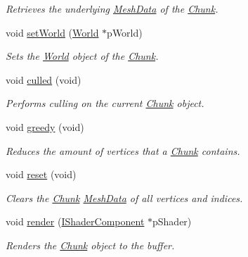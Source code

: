 \begin{DoxyCompactItemize}
\begin{DoxyCompactList}\small\item\em Retrieves the underlying \hyperlink{classsparky_1_1_mesh_data}{Mesh\+Data} of the \hyperlink{classsparky_1_1_chunk}{Chunk}. \end{DoxyCompactList}\item 
void \hyperlink{classsparky_1_1_chunk_a998e3e80913675edf552c927487a7df1}{set\+World} (\hyperlink{classsparky_1_1_world}{World} $\ast$p\+World)
\begin{DoxyCompactList}\small\item\em Sets the \hyperlink{classsparky_1_1_world}{World} object of the \hyperlink{classsparky_1_1_chunk}{Chunk}. \end{DoxyCompactList}\item 
void \hyperlink{classsparky_1_1_chunk_ab9a672846c269ca0554e489b10c973d5}{culled} (void)
\begin{DoxyCompactList}\small\item\em Performs culling on the current \hyperlink{classsparky_1_1_chunk}{Chunk} object. \end{DoxyCompactList}\item 
void \hyperlink{classsparky_1_1_chunk_a007d463c5ec8c516cc10a6aed31f028e}{greedy} (void)
\begin{DoxyCompactList}\small\item\em Reduces the amount of vertices that a \hyperlink{classsparky_1_1_chunk}{Chunk} contains. \end{DoxyCompactList}\item 
void \hyperlink{classsparky_1_1_chunk_a0d89521b4e322fb1f3b8a031b2f61355}{reset} (void)\hypertarget{classsparky_1_1_chunk_a0d89521b4e322fb1f3b8a031b2f61355}{}\label{classsparky_1_1_chunk_a0d89521b4e322fb1f3b8a031b2f61355}

\begin{DoxyCompactList}\small\item\em Clears the \hyperlink{classsparky_1_1_chunk}{Chunk} \hyperlink{classsparky_1_1_mesh_data}{Mesh\+Data} of all vertices and indices. \end{DoxyCompactList}\item 
void \hyperlink{classsparky_1_1_chunk_a24afefc8aa1fe69218a4e25ce9c06dc2}{render} (\hyperlink{classsparky_1_1_i_shader_component}{I\+Shader\+Component} $\ast$p\+Shader)\hypertarget{classsparky_1_1_chunk_a24afefc8aa1fe69218a4e25ce9c06dc2}{}\label{classsparky_1_1_chunk_a24afefc8aa1fe69218a4e25ce9c06dc2}

\begin{DoxyCompactList}\small\item\em Renders the \hyperlink{classsparky_1_1_chunk}{Chunk} object to the buffer. \end{DoxyCompactList}\end{DoxyCompactItemize}
